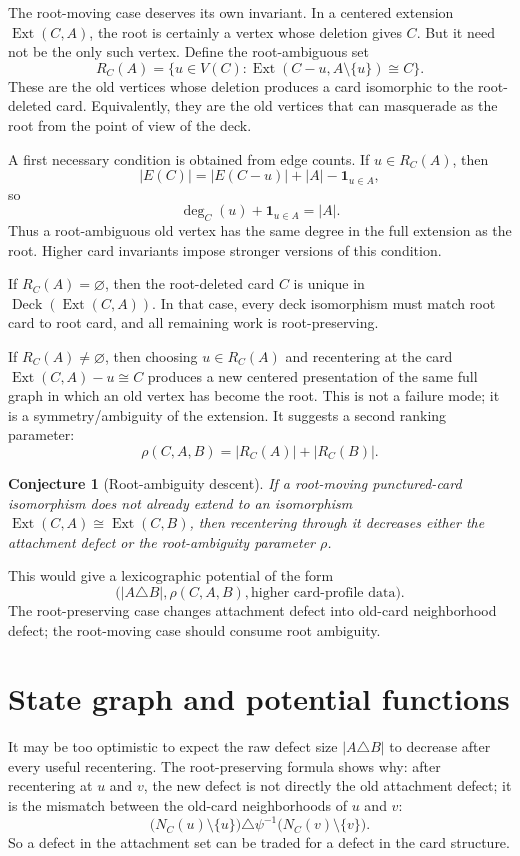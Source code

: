 \documentclass[11pt]{article}
\newtheorem{conjecture}{Conjecture}
\newcommand{\Deck}{\operatorname{Deck}}
\newcommand{\Ext}{\operatorname{Ext}}
\newcommand{\one}{\mathbf{1}}
\begin{document}
The root-moving case deserves its own invariant.  In a centered extension
\(\Ext(C,A)\), the root is certainly a vertex whose deletion gives \(C\).
But it need not be the only such vertex.  Define the root-ambiguous set
\[
  R_C(A)
  =
  \{u\in V(C) : \Ext(C-u,A\setminus\{u\}) \cong C\}.
\]
These are the old vertices whose deletion produces a card isomorphic to the
root-deleted card.  Equivalently, they are the old vertices that can masquerade
as the root from the point of view of the deck.

A first necessary condition is obtained from edge counts.  If
\(u\in R_C(A)\), then
\[
  |E(C)|
  =
  |E(C-u)| + |A|-\one_{u\in A},
\]
so
\[
  \deg_C(u)+\one_{u\in A}=|A|.
\]
Thus a root-ambiguous old vertex has the same degree in the full extension as
the root.  Higher card invariants impose stronger versions of this condition.

If \(R_C(A)=\varnothing\), then the root-deleted card \(C\) is unique in
\(\Deck(\Ext(C,A))\).  In that case, every deck isomorphism must match root
card to root card, and all remaining work is root-preserving.

If \(R_C(A)\neq\varnothing\), then choosing \(u\in R_C(A)\) and recentering at
the card \(\Ext(C,A)-u\cong C\) produces a new centered presentation of the
same full graph in which an old vertex has become the root.  This is not a
failure mode; it is a symmetry/ambiguity of the extension.  It suggests a
second ranking parameter:
\[
  \rho(C,A,B)=|R_C(A)|+|R_C(B)|.
\]

\begin{conjecture}[Root-ambiguity descent]
If a root-moving punctured-card isomorphism does not already extend to an
isomorphism \(\Ext(C,A)\cong \Ext(C,B)\), then recentering through it decreases
either the attachment defect or the root-ambiguity parameter \(\rho\).
\end{conjecture}

This would give a lexicographic potential of the form
\[
  \bigl(|A\triangle B|,\rho(C,A,B),\text{higher card-profile data}\bigr).
\]
The root-preserving case changes attachment defect into old-card neighborhood
defect; the root-moving case should consume root ambiguity.

\section{State graph and potential functions}

It may be too optimistic to expect the raw defect size \(|A\triangle B|\) to
decrease after every useful recentering.  The root-preserving formula shows why:
after recentering at \(u\) and \(v\), the new defect is not directly the old
attachment defect; it is the mismatch between the old-card neighborhoods of
\(u\) and \(v\):
\[
  \bigl(N_C(u)\setminus\{u\}\bigr)
  \triangle
  \psi^{-1}\bigl(N_C(v)\setminus\{v\}\bigr).
\]
So a defect in the attachment set can be traded for a defect in the card
structure.
\end{document}
